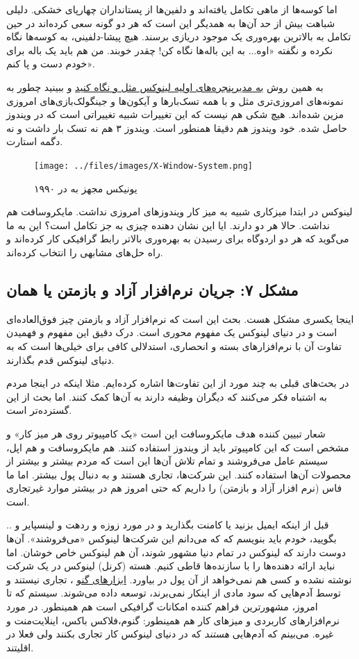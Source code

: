 اما کوسه‌ها از ماهی تکامل یافته‌اند و دلفین‌ها از پستانداران چهارپای خشکی. دلیلی شباهت بیش از حد آن‌ها به همدیگر این است که هر دو گونه سعی کرده‌اند در حین تکامل به بالاترین بهره‌وری یک موجود دریازی برسند. هیچ پیشا-دلفینی، به کوسه‌ها نگاه نکرده و نگفته «اوه... به این باله‌ها نگاه کن! چقدر خوبند. من هم باید یک باله برای خودم دست و پا کنم».

به همین روش
\href{http://xwinman.org/}{به مدیرپنجره‌های اولیه لینوکس مثل 
 و 
 نگاه کنید}
و ببینید چطور به نمونه‌های امروزی‌تری مثل 
 و 
 با همه تسک‌بارها و آیکون‌ها و جینگولک‌بازی‌های امروزی مزین شده‌اند. هیچ شکی هم نیست که این تغییرات شبیه تغییراتی است که در ویندوز حاصل شده. خود ویندوز هم دقیقا همنطور است. ویندوز ۳ هم نه تسک بار داشت و نه دگمه استارت.
\begin{figure}[H]
\texttt{[image: ../files/images/X-Window-System.png]}
\caption{یونیکس مجهز به 
	در ۱۹۹۰}
\end{figure}


لینوکس در ابتدا میزکاری شبیه به میز کار ویندوزهای امروزی نداشت. مایکروسافت هم نداشت. حالا هر دو دارند. ایا این نشان دهنده چیزی به جز تکامل است؟‌
این به ما می‌گوید که هر دو اردوگاه برای رسیدن به بهره‌وری بالاتر رابط گرافیکی کار کرده‌اند و راه حل‌های مشابهی را انتخاب کرده‌اند.
\subsection*{مشکل ۷: جریان نرم‌افزار آزاد و بازمتن یا همان 
}
اینجا یکسری مشکل هست. بحث این است که نرم‌افزار آزاد و بازمتن چیز فوق‌العاده‌ای است و در دنیای لینوکس یک مفهوم محوری است. درک دقیق این مفهوم و فهمیدن تفاوت آن با نرم‌افزارهای بسته و انحصاری، استدلالی کافی برای خیلی‌ها است که به دنیای لینوکس قدم بگذارند.

در بحث‌های قبلی به چند مورد از این تفاوت‌ها اشاره کرده‌ایم. مثلا اینکه در اینجا مردم به اشتباه فکر می‌کنند که دیگران وظیفه دارند به آن‌ها کمک کنند. اما بحث از این گسترده‌تر است.

شعار تبیین کننده هدف مایکروسافت این است «یک کامپیوتر روی هر میز کار» و مشخص است که این کامپیوتر باید از ویندوز استفاده کنند. هم مایکروسافت و هم اپل، سیستم عامل می‌فروشند و تمام تلاش آن‌ها این است که مردم بیشتر و بیشتر از محصولات آن‌ها استفاده کنند. این شرکت‌ها، تجاری هستند و به دنبال پول بیشتر.
اما ما فاس (نرم افزار آزاد و بازمتن) را داریم که حتی امروز هم در بیشتر موارد غیرتجاری است.

قبل از اینکه ایمیل بزنید یا کامنت بگذارید و در مورد زوزه و ردهت و لینسپایر و .. بگویید، خودم باید بنویسم که که می‌دانم این شرکت‌ها لینوکس «می‌فروشند». آن‌ها دوست دارند که لینوکس در تمام دنیا مشهور شوند، آن هم لینوکس خاص خوشان. اما نباید ارائه دهنده‌ها را با سازنده‌ها قاطی کنیم. هسته (کرنل) لینوکس در یک شرکت نوشته نشده و کسی هم نمی‌خواهد از آن پول در بیاورد.
\href{http://www.gnu.org/home.fa.html}{ابزارهای گنو}
، تجاری نیستند و توسط آدم‌هایی که سود مادی از اینکار نمی‌برند، توسعه داده می‌شوند. سیستم 
 که تا امروز، مشهورترین فراهم کننده امکانات گرافیکی است هم همینطور. در مورد نرم‌افزارهای کاربردی و میزهای کار هم همینطور: گنوم،‌فلاکس باکس، اینلایت‌منت و غیره. می‌بینم که آدم‌هایی
\emph{هستند}
که در دنیای لینوکس کار تجاری بکنند ولی فعلا در اقلیتند.

